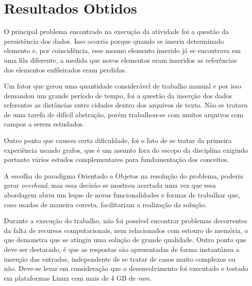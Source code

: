 \chapter*[Resultados Obtidos]{Resultados Obtidos}

O principal problema encontrado na execução da atividade foi a questão da persistência dos 
dados. Isso ocorria porque quando se inseria determinado elemento e, por coincidência, esse mesmo 
elemento inserido já se encontrava em uma fila diferente, a medida que novos elementos eram inseridos as referências dos elementos enfileirados eram perdidas.

Um fator que gerou uma quantidade considerável de trabalho manual e por isso demandou um grande período de 
tempo, foi a questão da inserção dos dados referentes as distâncias entre cidades dentro dos arquivos de 
texto. Não se tratava de uma tarefa de difícil abstração, porém trabalhou-se com muitos arquivos com campos 
a serem estudados. 

Outro ponto que causou certa dificuldade, foi o fato de se tratar da primeira experiência usando grafos,
que é um assunto fora do escopo da disciplina exigindo portanto vários estudos complementares para 
fundamentação dos conceitos. 

A escolha do paradigma Orientado a Objetos na resolução do problema, poderia gerar \textit{overhead}, mas essa decisão se mostrou acertada uma vez que essa abordagem abriu um leque de novas funcionalidades e 
formas de trabalhar que, caso usadas de maneira correta, facilitariam a realização da solução.

Durante a execução do trabalho, não foi possível encontrar problemas decorrentes da falta de recursos 
computacionais, nem relacionados com estouro de memória, o que demonstra que se atingiu uma solução de 
grande qualidade. Outro ponto que deve ser destacado, é que as respostas são apresentadas de forma instantânea a inserção das entradas, independente de se tratar de casos muito complexos ou não. Deve-se levar em consideração que o desenvolvimento foi executado e testado em plataformas Linux com mais de 4 GB de \textit{ram}.